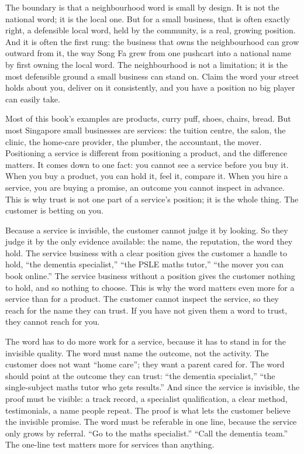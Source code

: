 \documentclass[10pt,twoside,openany]{memoir}
\begin{document}
{The boundary is that a neighbourhood word is small by design. It is not
the national word; it is the local one. But for a small business, that
is often exactly right, a defensible local word, held by the community,
is a real, growing position. And it is often the first rung: the
business that owns the neighbourhood can grow outward from it, the way
Song Fa grew from one pushcart into a national name by first owning the
local word. The neighbourhood is not a limitation; it is the most
defensible ground a small business can stand on. Claim the word your
street holds about you, deliver on it consistently, and you have a
position no big player can easily take.

Most of this book's examples are products, curry puff, shoes, chairs,
bread. But most Singapore small businesses are services: the tuition
centre, the salon, the clinic, the home-care provider, the plumber, the
accountant, the mover. Positioning a service is different from
positioning a product, and the difference matters. It comes down to one
fact: you cannot see a service before you buy it. When you buy a
product, you can hold it, feel it, compare it. When you hire a service,
you are buying a promise, an outcome you cannot inspect in advance. This
is why trust is not one part of a service's position; it is the whole
thing. The customer is betting on you.

Because a service is invisible, the customer cannot judge it by looking.
So they judge it by the only evidence available: the name, the
reputation, the word they hold. The service business with a clear
position gives the customer a handle to hold, ``the dementia
specialist,'' ``the PSLE maths tutor,'' ``the mover you can book
online.'' The service business without a position gives the customer
nothing to hold, and so nothing to choose. This is why the word matters
even more for a service than for a product. The customer cannot inspect
the service, so they reach for the name they can trust. If you have not
given them a word to trust, they cannot reach for you.

The word has to do more work for a service, because it has to stand in
for the invisible quality. The word must name the outcome, not the
activity. The customer does not want ``home care''; they want a parent
cared for. The word should point at the outcome they can trust: ``the
dementia specialist,'' ``the single-subject maths tutor who gets
results.'' And since the service is invisible, the proof must be
visible: a track record, a specialist qualification, a clear method,
testimonials, a name people repeat. The proof is what lets the customer
believe the invisible promise. The word must be referable in one line,
because the service only grows by referral. ``Go to the maths
specialist.'' ``Call the dementia team.'' The one-line test matters more
for services than anything.

}
\end{document}
